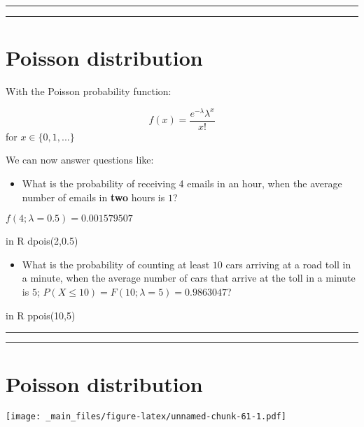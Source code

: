\documentclass[
]{book}
\providecommand{\tightlist}{%
  \setlength{\itemsep}{0pt}\setlength{\parskip}{0pt}}
\begin{document}
\begin{center}\rule{0.5\linewidth}{0.5pt}\end{center}

\begin{center}\rule{0.5\linewidth}{0.5pt}\end{center}

\hypertarget{poisson-distribution-4}{%
\section{Poisson distribution}\label{poisson-distribution-4}}

With the Poisson probability function:

\[f(x)= \frac{e^{-\lambda}\lambda^x}{x!}\] for \(x \in \{0, 1, ...\}\)

We can now answer questions like:

\begin{itemize}
\tightlist
\item
  What is the probability of receiving 4 emails in an hour, when the average number of emails in \textbf{two} hours is \(1\)?
\end{itemize}

\(f(4; \lambda=0.5)=0.001579507\)

in R dpois(2,0.5)

\begin{itemize}
\tightlist
\item
  What is the probability of counting at least \(10\) cars arriving at a road toll in a minute, when the average number of cars that arrive at the toll in a minute is \(5\);
  \(P(X \leq 10)=F(10; \lambda=5)=0.9863047\)?
\end{itemize}

in R ppois(10,5)

\begin{center}\rule{0.5\linewidth}{0.5pt}\end{center}

\begin{center}\rule{0.5\linewidth}{0.5pt}\end{center}

\hypertarget{poisson-distribution-5}{%
\section{Poisson distribution}\label{poisson-distribution-5}}

\texttt{[image: \_main\_files/figure-latex/unnamed-chunk-61-1.pdf]}
\end{document}
